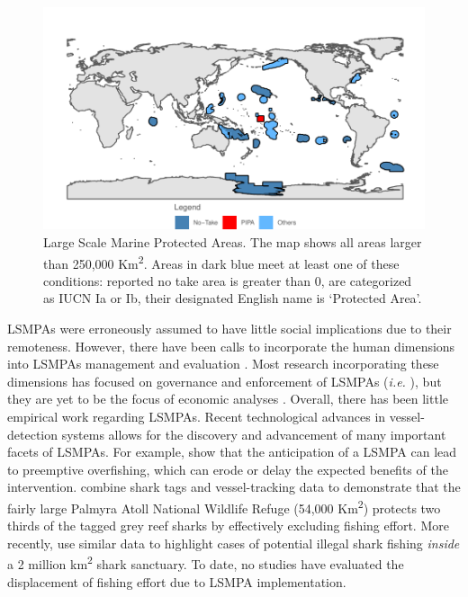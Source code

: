 \documentclass[9pttwoside,lineno]{pnas-new}
\begin{document}
\begin{figure}
\centering
\includegraphics{img/LSMPAs_map.pdf}
\caption{\label{fig:LSMPAs_map}Large Scale Marine
Protected Areas. The map shows all areas larger than 250,000
Km\textsuperscript{2}. Areas in dark blue meet at least one of these
conditions: reported no take area is greater than 0, are categorized as
IUCN Ia or Ib, their designated English name is `Protected Area'.}
\end{figure}

LSMPAs were erroneously assumed to have little social implications due
to their remoteness. However, there have been calls to incorporate the
human dimensions into LSMPAs management and evaluation
\citep{agardy_2011,gray_2017}. Most research incorporating these
dimensions has focused on governance and enforcement of LSMPAs
(\emph{i.e.} \citet{alger_2017,christie_2017}), but they are yet to be
the focus of economic analyses \citep{gray_2017}. Overall, there has
been little empirical work regarding LSMPAs. Recent technological
advances in vessel-detection systems allows for the discovery and
advancement of many important facets of LSMPAs. For example,
\citet{mcdermott_2018} show that the anticipation of a LSMPA can lead to
preemptive overfishing, which can erode or delay the expected benefits
of the intervention. \citet{white_2017} combine shark tags and
vessel-tracking data to demonstrate that the fairly large Palmyra Atoll
National Wildlife Refuge (54,000 Km\textsuperscript{2}) protects two
thirds of the tagged grey reef sharks by effectively excluding fishing
effort. More recently, \citep{bradley_2018} use similar data to
highlight cases of potential illegal shark fishing \emph{inside} a 2
million km\textsuperscript{2} shark sanctuary. To date, no studies have
evaluated the displacement of fishing effort due to LSMPA
implementation.
\end{document}

